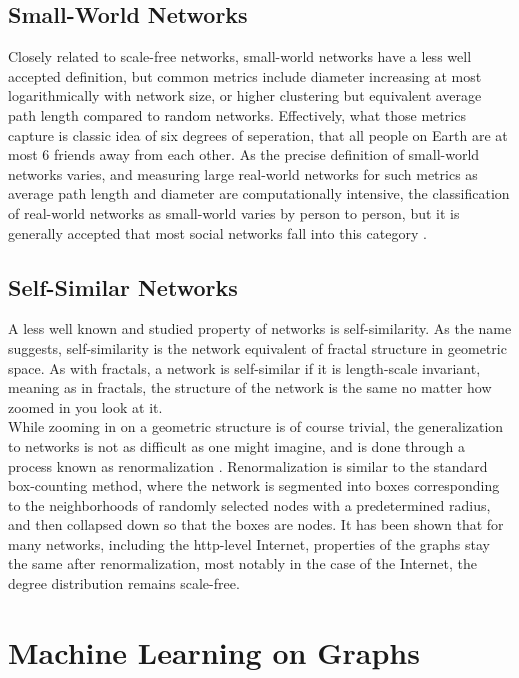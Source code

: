 \documentclass[12pt,twoside]{report}
\begin{document}
\subsection{Small-World Networks}
Closely related to scale-free networks, small-world networks have a less well accepted definition, but common metrics include diameter increasing at most logarithmically with network size, or higher clustering but equivalent average path length compared to random networks. Effectively, what those metrics capture is classic idea of six degrees of seperation, that all people on Earth are at most 6 friends away from each other. As the precise definition of small-world networks varies, and measuring large real-world networks for such metrics as average path length and diameter are computationally intensive, the classification of real-world networks as small-world varies by person to person, but it is generally accepted that most social networks fall into this category \cite{telesford2011ubiquity}. \\

\subsection{Self-Similar Networks}
A less well known and studied property of networks is self-similarity. As the name suggests, self-similarity is the network equivalent of fractal structure in geometric space. As with fractals, a network is self-similar if it is length-scale invariant, meaning as in fractals, the structure of the network is the same no matter how zoomed in you look at it. \\

While zooming in on a geometric structure is of course trivial, the generalization to networks is not as difficult as one might imagine, and is done through a process known as renormalization \cite{song2005self}. Renormalization is similar to the standard box-counting method, where the network is segmented into boxes corresponding to the neighborhoods of randomly selected nodes with a predetermined radius, and then collapsed down so that the boxes are nodes. It has been shown that for many networks, including the http-level Internet, properties of the graphs stay the same after renormalization, most notably in the case of the Internet, the degree distribution remains scale-free. \\

\section{Machine Learning on Graphs}
\end{document}
